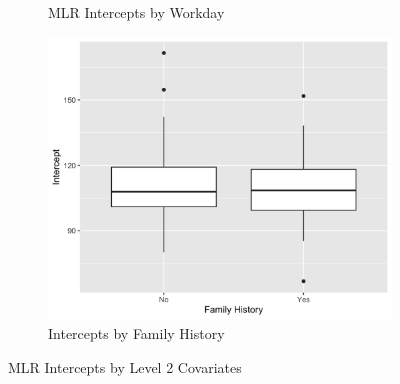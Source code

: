 \documentclass[12pt,twoside,leqno,fleqn,letterpaper]{article}
\theoremstyle{definition}
\theoremstyle{definition}
\begin{document}
\begin{figure}
\begin{subfigure}[b]{0.32\textwidth}
    \caption[]%
    {{\small MLR Intercepts by Workday}}
    \label{fig: int v day}
    \end{subfigure}
    \hfill
    \begin{subfigure}[b]{0.32\textwidth}
    \centering
    \includegraphics[width=\textwidth]{pics/mlr int by fh.png}
    \caption[]%
    {{\small Intercepts by Family History}}
    \label{fig: int v fh}
    \end{subfigure}
    \caption[]
    {\small MLR Intercepts by Level 2 Covariates}
    \label{fig: int v lv2}
    \end{figure}
\end{document}
